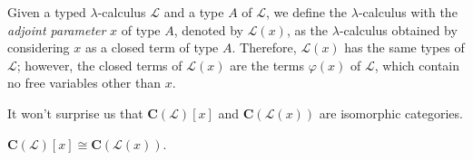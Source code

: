 \begin{definition}\label{idx:parameter-calculus}
    Given a typed $\lambda$-calculus $\mathcal L$ and a type $A$ of $\mathcal L$, we define the $\lambda$-calculus with the \emph{adjoint parameter} $x$ of type $A$, denoted by $\mathcal L(x)$,
    as the $\lambda$-calculus obtained by considering $x$ as a closed term of type $A$. Therefore, $\mathcal L(x)$ has the same types of $\mathcal L$; however, the closed terms of $\mathcal L(x)$
are the terms $\varphi(x)$ of $\mathcal L$, which contain no free variables other than $x$.
\end{definition}

It won't surprise us that $\mathbf C(\mathcal L)[x]$ and $\mathbf C(\mathcal L(x))$ are isomorphic categories.

\begin{proposition}\label{prop:lambda-calculus-with-parameter}
    $\mathbf C(\mathcal L)[x] \cong \mathbf C(\mathcal L(x))$.
\end{proposition}

